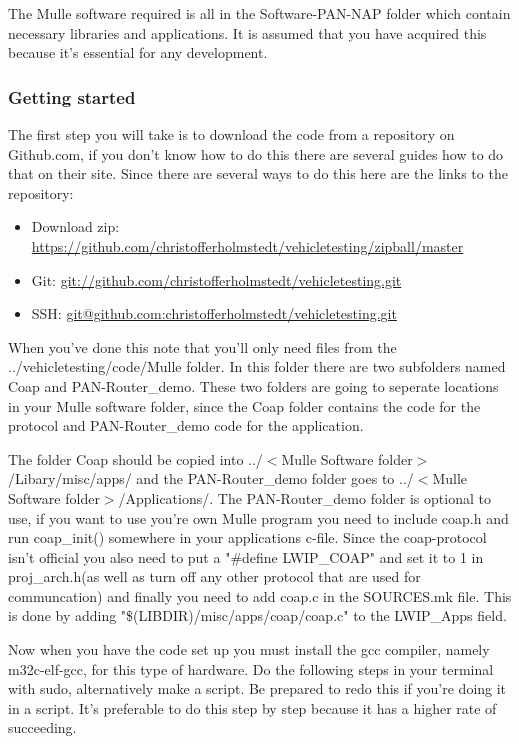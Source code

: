 The Mulle software required is all in the Software-PAN-NAP folder which contain necessary libraries and applications. It is assumed that you have acquired this because it's essential for any development.

\subsubsection{Getting started}
The first step you will take is to download the code from a repository on Github.com, if you don't know how to do this there are several guides how to do that on their site. Since there are several ways to do this here are the links to the repository:
\begin{itemize}
\item Download zip: \url{https://github.com/christofferholmstedt/vehicletesting/zipball/master}
\item Git: \url{git://github.com/christofferholmstedt/vehicletesting.git}
\item SSH: \url{git@github.com:christofferholmstedt/vehicletesting.git}
\end{itemize}
When you've done this note that you'll only need files from the ../vehicletesting/code/Mulle folder.
In this folder there are two subfolders named Coap and PAN-Router\_demo. 
These two folders are going to seperate locations in your Mulle software folder, 
since the Coap folder contains the code for the protocol and PAN-Router\_demo code for the application. 

The folder Coap should be copied into ../$<$Mulle Software folder$>$/Libary/misc/apps/ 
and the PAN-Router\_demo folder goes to  ../$<$Mulle Software folder$>$/Applications/. 
The PAN-Router\_demo folder is optional to use, if you want to use you're own Mulle program you need to include coap.h and run coap\_init() somewhere in your applications c-file. 
Since the coap-protocol isn't official you also need to put a "\#define LWIP\_COAP" and set it to 1 in proj\_arch.h(as well as turn off any other protocol that are used for communcation) 
and finally you need to add coap.c in the SOURCES.mk file. This is done by adding "\$(LIBDIR)/misc/apps/coap/coap.c" to the LWIP\_Apps field.

Now when you have the code set up you must install the gcc compiler, namely m32c-elf-gcc, for this type of hardware. Do the following steps in your terminal with sudo, alternatively make a script. Be prepared to redo this if you're doing it in a script. It's preferable to do this step by step because it has a higher rate of succeeding. 

